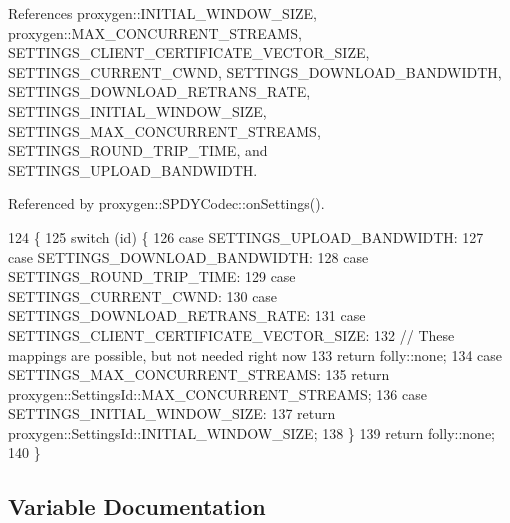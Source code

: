 References proxygen\+::\+I\+N\+I\+T\+I\+A\+L\+\_\+\+W\+I\+N\+D\+O\+W\+\_\+\+S\+I\+ZE, proxygen\+::\+M\+A\+X\+\_\+\+C\+O\+N\+C\+U\+R\+R\+E\+N\+T\+\_\+\+S\+T\+R\+E\+A\+MS, S\+E\+T\+T\+I\+N\+G\+S\+\_\+\+C\+L\+I\+E\+N\+T\+\_\+\+C\+E\+R\+T\+I\+F\+I\+C\+A\+T\+E\+\_\+\+V\+E\+C\+T\+O\+R\+\_\+\+S\+I\+ZE, S\+E\+T\+T\+I\+N\+G\+S\+\_\+\+C\+U\+R\+R\+E\+N\+T\+\_\+\+C\+W\+ND, S\+E\+T\+T\+I\+N\+G\+S\+\_\+\+D\+O\+W\+N\+L\+O\+A\+D\+\_\+\+B\+A\+N\+D\+W\+I\+D\+TH, S\+E\+T\+T\+I\+N\+G\+S\+\_\+\+D\+O\+W\+N\+L\+O\+A\+D\+\_\+\+R\+E\+T\+R\+A\+N\+S\+\_\+\+R\+A\+TE, S\+E\+T\+T\+I\+N\+G\+S\+\_\+\+I\+N\+I\+T\+I\+A\+L\+\_\+\+W\+I\+N\+D\+O\+W\+\_\+\+S\+I\+ZE, S\+E\+T\+T\+I\+N\+G\+S\+\_\+\+M\+A\+X\+\_\+\+C\+O\+N\+C\+U\+R\+R\+E\+N\+T\+\_\+\+S\+T\+R\+E\+A\+MS, S\+E\+T\+T\+I\+N\+G\+S\+\_\+\+R\+O\+U\+N\+D\+\_\+\+T\+R\+I\+P\+\_\+\+T\+I\+ME, and S\+E\+T\+T\+I\+N\+G\+S\+\_\+\+U\+P\+L\+O\+A\+D\+\_\+\+B\+A\+N\+D\+W\+I\+D\+TH.



Referenced by proxygen\+::\+S\+P\+D\+Y\+Codec\+::on\+Settings().


\begin{DoxyCode}
124                              \{
125   \textcolor{keywordflow}{switch} (\textcolor{keywordtype}{id}) \{
126     \textcolor{keywordflow}{case} SETTINGS_UPLOAD_BANDWIDTH:
127     \textcolor{keywordflow}{case} SETTINGS_DOWNLOAD_BANDWIDTH:
128     \textcolor{keywordflow}{case} SETTINGS_ROUND_TRIP_TIME:
129     \textcolor{keywordflow}{case} SETTINGS_CURRENT_CWND:
130     \textcolor{keywordflow}{case} SETTINGS_DOWNLOAD_RETRANS_RATE:
131     \textcolor{keywordflow}{case} SETTINGS_CLIENT_CERTIFICATE_VECTOR_SIZE:
132       \textcolor{comment}{// These mappings are possible, but not needed right now}
133       \textcolor{keywordflow}{return} folly::none;
134     \textcolor{keywordflow}{case} SETTINGS_MAX_CONCURRENT_STREAMS:
135       \textcolor{keywordflow}{return} proxygen::SettingsId::MAX_CONCURRENT_STREAMS;
136     \textcolor{keywordflow}{case} SETTINGS_INITIAL_WINDOW_SIZE:
137       \textcolor{keywordflow}{return} proxygen::SettingsId::INITIAL_WINDOW_SIZE;
138   \}
139   \textcolor{keywordflow}{return} folly::none;
140 \}
\end{DoxyCode}


\subsection{Variable Documentation}
